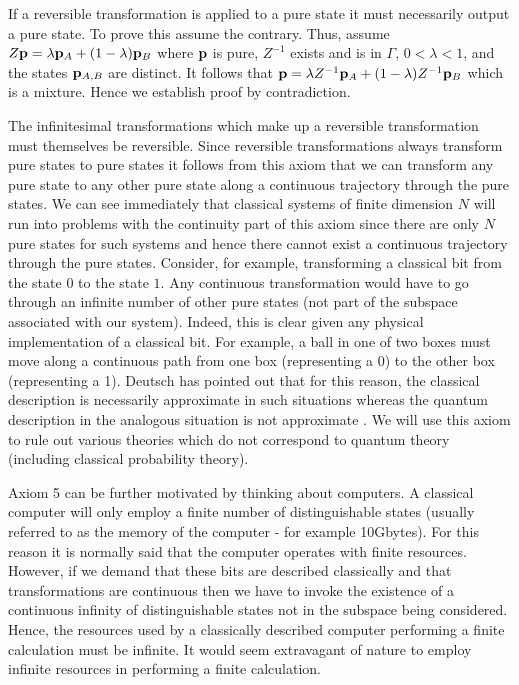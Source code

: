 \documentclass[10pt,twocolumn]{article}
\begin{document}
If a reversible transformation
is applied to a pure state it must necessarily output a pure state.  To
prove this assume the contrary.  Thus, assume $Z{\bf p}=\lambda{\bf
p}_A+(1-\lambda){\bf p}_B$ where ${\bf p}$ is pure, $Z^{-1}$ exists and
is in $\Gamma$, $0<\lambda<1$, and the states ${\bf p}_{A,B}$ are distinct.
It follows that ${\bf p}=\lambda Z^{-1}{\bf p}_A+(1-\lambda)Z^{-1}{\bf p}_B$
which is a mixture. Hence we establish proof by contradiction.

The infinitesimal transformations which make up a reversible
transformation must themselves be reversible. 
Since reversible transformations always transform pure states to pure
states it follows from this axiom that we can transform any pure state
to any other pure state along a continuous trajectory through the pure states.
We can see immediately that classical systems of finite
dimension $N$ will run into problems with the continuity part of this
axiom since there are only $N$ pure states for such systems and hence
there cannot exist a continuous trajectory through the pure states.
Consider, for example, transforming a
classical bit from the state $0$ to the state $1$.  Any continuous
transformation would have to go through an infinite number of other pure
states (not part of the subspace associated with our system).
Indeed, this is clear given any
physical implementation of a classical bit.  For example, a ball in one
of two boxes must move along a continuous path from one box (representing
a 0) to the other box (representing a 1).  Deutsch has pointed out that
for this reason, the classical description is necessarily approximate in
such situations whereas the quantum description in the analogous
situation is not approximate \cite{deutsch}.  We will use this axiom to
rule out various theories which do not correspond to quantum theory
(including classical probability theory).

Axiom 5 can be further motivated by thinking about computers.  A
classical computer will only employ a finite number of distinguishable
states (usually referred to as the memory of the computer - for example
10Gbytes).  For this reason it is normally said that the computer operates
with finite resources. However, if we
demand that these bits are described classically and that
transformations are continuous then we have to invoke the existence of
a continuous infinity of distinguishable states not in the subspace
being considered.  Hence, the resources used by a classically described
computer performing a finite calculation must be infinite.  It would seem
extravagant of nature to employ infinite resources in performing a
finite calculation.
\end{document}
